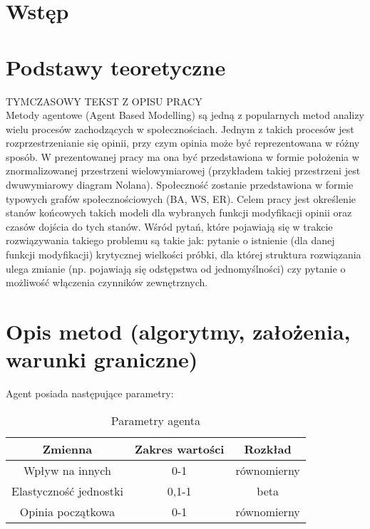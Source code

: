 \documentclass{wfiisul}
\begin{document}





\stronatytulowa


\chapter{Wstęp}

\chapter{Podstawy teoretyczne}

TYMCZASOWY TEKST Z OPISU PRACY \\
Metody agentowe (Agent Based Modelling) są jedną z popularnych metod analizy wielu procesów zachodzących w społecznościach.
Jednym z takich procesów jest rozprzestrzenianie się opinii, przy czym opinia może być reprezentowana w różny sposób.
W prezentowanej pracy ma ona być przedstawiona w formie położenia w znormalizowanej przestrzeni wielowymiarowej (przykładem takiej przestrzeni jest dwuwymiarowy diagram Nolana).
Społeczność zostanie przedstawiona w formie typowych grafów społecznościowych (BA, WS, ER).
Celem pracy jest określenie stanów końcowych takich modeli dla wybranych funkcji modyfikacji opinii oraz czasów dojścia do tych stanów.
Wśród pytań, które pojawiają się w trakcie rozwiązywania takiego problemu są takie jak: 
pytanie o istnienie (dla danej funkcji modyfikacji) krytycznej wielkości próbki, dla której struktura rozwiązania ulega zmianie (np. pojawiają się odstępstwa od jednomyślności) czy pytanie o możliwość włączenia czynników zewnętrznych.

\chapter{Opis metod (algorytmy, założenia, warunki graniczne)}

Agent posiada następujące parametry:
\begin{table}[htbp]
  \centering
  \begin{tabular}{c|c|c}
    \hline
    Zmienna & Zakres wartości & Rozkład \\
    \hline
    Wpływ na innych & 0-1 & równomierny \\
    Elastyczność jednostki & 0,1-1 & beta \\
    Opinia początkowa & 0-1 & równomierny \\
  \end{tabular}
  \caption{Parametry agenta}
  \label{tab:agent_parameters}
\end{table}
\end{document}
